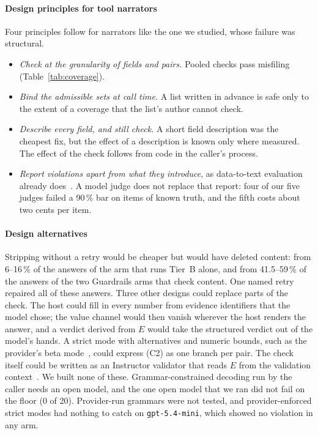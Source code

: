 \documentclass[journal]{IEEEtran}
\begin{document}
\paragraph{Design principles for tool narrators}
Four principles follow for narrators like the one we studied, whose failure was
structural.
\begin{itemize}
\item \emph{Check at the granularity of fields and pairs.} Pooled checks pass
misfiling (Table~\ref{tab:coverage}).
\item \emph{Bind the admissible sets at call time.} A list written in advance is
safe only to the extent of a coverage that the list's author cannot check.
\item \emph{Describe every field, and still check.} A short field description was
the cheapest fix, but the effect of a description is known only where measured.
The effect of the check follows from code in the caller's process.
\item \emph{Report violations apart from what they introduce}, as data-to-text
evaluation already does~\cite{pagnoni2021frank,thomson2020gold}. A model judge
does not replace that report: four of our five judges failed a 90\,\% bar on
items of known truth, and the fifth costs about two cents per item.
\end{itemize}

\paragraph{Design alternatives}
Stripping without a retry would be cheaper but would have deleted content: from
6--16\,\% of the answers of the arm that runs Tier~B alone, and from 41.5--59\,\%
of the answers of the two Guardrails arms that check content. One named retry
repaired all of these answers. Three other designs could replace parts of the
check. The host could fill in every number from evidence identifiers that the
model chose; the value channel would then vanish wherever the host renders the
answer, and a verdict derived from $E$ would take the structured verdict out of
the model's hands. A strict mode with alternatives and numeric bounds, such as
the provider's beta mode~\cite{deepseek2026toolcalls}, could express (C2) as one
branch per pair. The check itself could be written as an Instructor validator
that reads $E$ from the validation context~\cite{liu2023instructor}. We built
none of these. Grammar-constrained decoding run by the caller needs an open
model, and the one open model that we ran did not fail on the floor (0 of 20).
Provider-run grammars were not tested, and provider-enforced strict modes had
nothing to catch on \texttt{gpt-5.4-mini}, which showed no violation in any arm.
\end{document}
